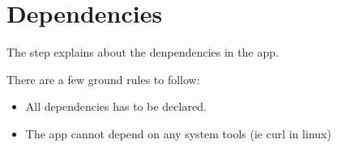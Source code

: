 \section*{Dependencies}
The step explains about the denpendencies in the app.

There are a few ground rules to follow:

\begin{itemize}
\item All dependencies has to be declared.
\item The app cannot depend on any system tools (ie curl in linux)
\end{itemize}
